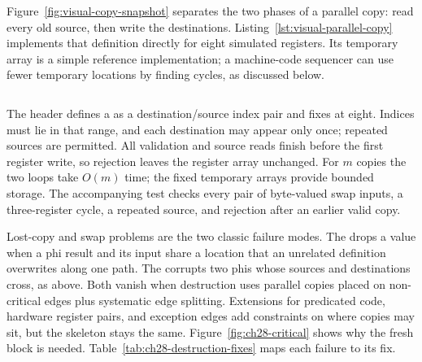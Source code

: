 Figure~\ref{fig:visual-copy-snapshot} separates the two phases of a parallel copy: read every old source, then write the destinations.
Listing~\ref{lst:visual-parallel-copy} implements that definition directly for eight simulated registers.
Its temporary array is a simple reference implementation; a machine-code sequencer can use fewer temporary locations by finding cycles, as discussed below.




\begin{listing}[htbp]
  \inputminted{c}{example-code/visual-labs/copy.c}
  \caption{Snapshotting source values preserves swaps and longer copy cycles without overwriting an unread source.}
  \label{lst:visual-parallel-copy}
\end{listing}

The header defines a  as a destination/source index pair and fixes  at eight.
Indices must lie in that range, and each destination may appear only once; repeated sources are permitted.
All validation and source reads finish before the first register write, so rejection leaves the register array unchanged.
For $m$ copies the two loops take $O(m)$ time; the fixed temporary arrays provide bounded storage.
The accompanying test checks every pair of byte-valued swap inputs, a three-register cycle, a repeated source, and rejection after an earlier valid copy.

Lost-copy and swap problems are the two classic failure modes.
The  drops a value when a phi result and its input share a location that an unrelated definition overwrites along one path.
The  corrupts two phis whose sources and destinations cross, as above.
Both vanish when destruction uses parallel copies placed on non-critical edges plus systematic edge splitting.
Extensions for predicated code, hardware register pairs, and exception edges add constraints on where copies may sit, but the skeleton stays the same.
Figure~\ref{fig:ch28-critical} shows why the fresh block is needed.
Table~\ref{tab:ch28-destruction-fixes} maps each failure to its fix.

